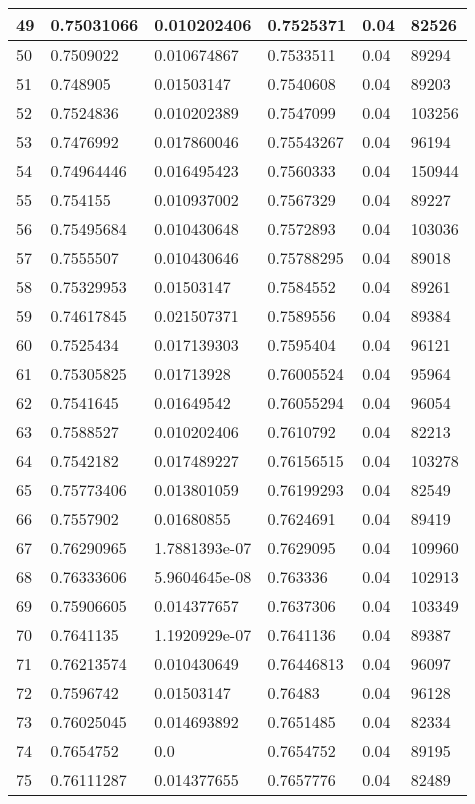 \begin{longtable}{|l|l|l|l|l|l|}
49 & 0.75031066 & 0.010202406 & 0.7525371 & 0.04 & 82526 \\ \hline 
50 & 0.7509022 & 0.010674867 & 0.7533511 & 0.04 & 89294 \\ \hline 
51 & 0.748905 & 0.01503147 & 0.7540608 & 0.04 & 89203 \\ \hline 
52 & 0.7524836 & 0.010202389 & 0.7547099 & 0.04 & 103256 \\ \hline 
53 & 0.7476992 & 0.017860046 & 0.75543267 & 0.04 & 96194 \\ \hline 
54 & 0.74964446 & 0.016495423 & 0.7560333 & 0.04 & 150944 \\ \hline 
55 & 0.754155 & 0.010937002 & 0.7567329 & 0.04 & 89227 \\ \hline 
56 & 0.75495684 & 0.010430648 & 0.7572893 & 0.04 & 103036 \\ \hline 
57 & 0.7555507 & 0.010430646 & 0.75788295 & 0.04 & 89018 \\ \hline 
58 & 0.75329953 & 0.01503147 & 0.7584552 & 0.04 & 89261 \\ \hline 
59 & 0.74617845 & 0.021507371 & 0.7589556 & 0.04 & 89384 \\ \hline 
60 & 0.7525434 & 0.017139303 & 0.7595404 & 0.04 & 96121 \\ \hline 
61 & 0.75305825 & 0.01713928 & 0.76005524 & 0.04 & 95964 \\ \hline 
62 & 0.7541645 & 0.01649542 & 0.76055294 & 0.04 & 96054 \\ \hline 
63 & 0.7588527 & 0.010202406 & 0.7610792 & 0.04 & 82213 \\ \hline 
64 & 0.7542182 & 0.017489227 & 0.76156515 & 0.04 & 103278 \\ \hline 
65 & 0.75773406 & 0.013801059 & 0.76199293 & 0.04 & 82549 \\ \hline 
66 & 0.7557902 & 0.01680855 & 0.7624691 & 0.04 & 89419 \\ \hline 
67 & 0.76290965 & 1.7881393e-07 & 0.7629095 & 0.04 & 109960 \\ \hline 
68 & 0.76333606 & 5.9604645e-08 & 0.763336 & 0.04 & 102913 \\ \hline 
69 & 0.75906605 & 0.014377657 & 0.7637306 & 0.04 & 103349 \\ \hline 
70 & 0.7641135 & 1.1920929e-07 & 0.7641136 & 0.04 & 89387 \\ \hline 
71 & 0.76213574 & 0.010430649 & 0.76446813 & 0.04 & 96097 \\ \hline 
72 & 0.7596742 & 0.01503147 & 0.76483 & 0.04 & 96128 \\ \hline 
73 & 0.76025045 & 0.014693892 & 0.7651485 & 0.04 & 82334 \\ \hline 
74 & 0.7654752 & 0.0 & 0.7654752 & 0.04 & 89195 \\ \hline 
75 & 0.76111287 & 0.014377655 & 0.7657776 & 0.04 & 82489 \\ \hline 
\end{longtable}